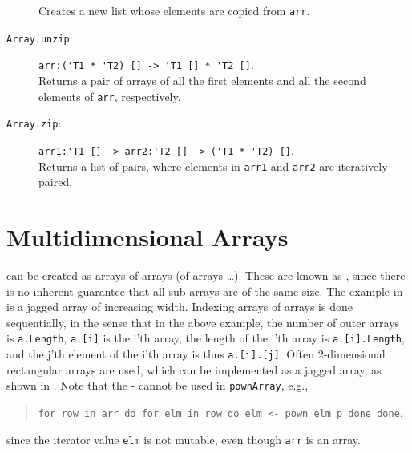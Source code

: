 \documentclass[springer.tex]{subfiles}
\begin{document}
\begin{description}
  Creates a new list whose elements are copied from \lstinline{arr}.
\item[\texttt{Array.unzip}:] \lstinline{arr:('T1 * 'T2) [] -> 'T1 [] * 'T2 []}.~\\
  Returns a pair of arrays of all the first elements and all the second elements of \lstinline{arr}, respectively.
\item[\texttt{Array.zip}:] \lstinline{arr1:'T1 [] -> arr2:'T2 [] -> ('T1 * 'T2) []}.~\\
  Returns a list of pairs, where elements in \lstinline{arr1} and \lstinline{arr2} are iteratively paired.
\end{description}

\section{Multidimensional Arrays}
 can be created as arrays of arrays (of arrays \dots). These are known as , since there is no inherent guarantee that all sub-arrays are of the same size. The example in  is a jagged array of increasing width.
%
%
Indexing arrays of arrays is done sequentially, in the sense that in the above example, the number of outer arrays is \lstinline|a.Length|,  \lstinline|a.[i]| is the i'th array, the length of the i'th array is \lstinline|a.[i].Length|, and the j'th element of the i'th array is thus \lstinline|a.[i].[j]|. Often 2-dimensional rectangular arrays are used, which can be implemented as a jagged array, as shown in .
%
%
Note that the - cannot be used in \lstinline!pownArray!, e.g., 
\begin{quote} 
  \mbox{\lstinline{for row in arr do for elm in row do elm <- pown elm p done done}},
 \end{quote}
since the iterator value \lstinline!elm! is not mutable, even though \lstinline!arr! is an array.
\end{document}
